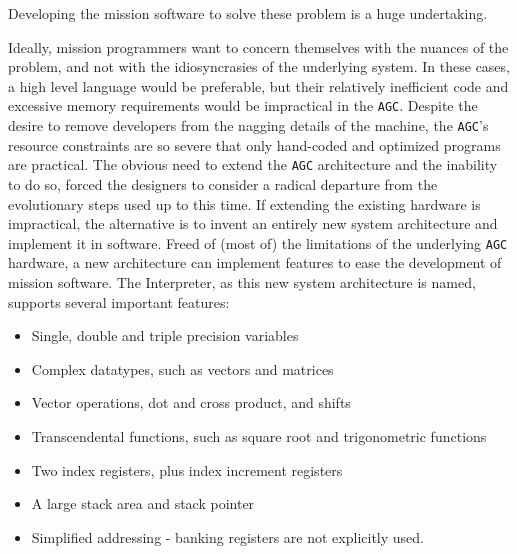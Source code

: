 \documentclass[refcap, oxford]{ahsan}
\begin{document}
Developing the mission software to solve these problem is a huge undertaking.

Ideally, mission programmers want to concern themselves with the nuances of the problem, and not with the idiosyncrasies of the underlying system. In these cases, a high level language would be preferable, but their relatively inefficient code and excessive memory requirements would be impractical in the \texttt{AGC}. Despite the desire to remove developers from the nagging details of the machine, the \texttt{AGC}'s resource constraints are so severe that only hand-coded and optimized programs are practical. The obvious need to extend the \texttt{AGC} architecture and the inability to do so, forced the designers to consider a radical departure from the evolutionary steps used up to this time. If extending the existing hardware is impractical, the alternative is to invent an entirely new system architecture and implement it in software. Freed of (most of) the limitations of the underlying \texttt{AGC} hardware, a new architecture can implement features to ease the development of mission software. The Interpreter, as this new system architecture is named, supports several important features:

\begin{itemize}
  \item Single, double and triple precision variables
  \item Complex datatypes, such as vectors and matrices
  \item Vector operations, dot and cross product, and shifts
  \item Transcendental functions, such as square root and trigonometric functions
  \item Two index registers, plus index increment registers
  \item A large stack area and stack pointer
  \item Simplified addressing - banking registers are not explicitly used.
\end{itemize}
\end{document}
